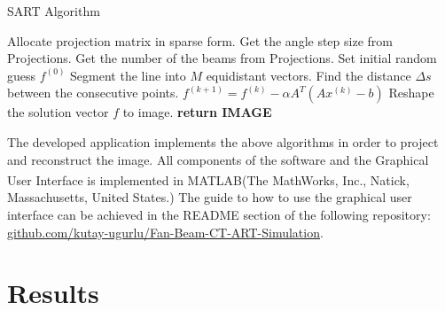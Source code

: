 \documentclass[journal]{IEEEtran}
\begin{document}
\begin{algorithm}[h]
	\caption{SART Algorithm}
	\begin{algorithmic}
		\State Allocate projection matrix in sparse form.
		\State Get the angle step size from Projections. 
		\State Get the number of the beams from Projections. 
		\State Set initial random guess $f^{(0)}$
				\State Segment the line into $M$ equidistant vectors. 
				\State Find the distance $\Delta s$ between the consecutive points.
				\EndFor 
			  \EndFor
		   \EndFor
				\State $f^{(k+1)} = f^{(k)} - \alpha A^T(Ax^{(k)}-b)$
		   \EndFor
		   \State Reshape the solution vector $f$ to image. 
		   \State \textbf{return IMAGE}
		\EndProcedure
	\label{alg:SART}
	\end{algorithmic}
\end{algorithm}

\newpage

The developed application implements the above algorithms in order to project and reconstruct the image. All components of the software and the Graphical User Interface is implemented in MATLAB(The MathWorks\textsuperscript{\textregistered}, Inc., Natick, Massachusetts, United States.) The guide to how to use the graphical user interface can be achieved in the README section of the following repository: \href{https://github.com/kutay-ugurlu/Fan-Beam-CT-ART-Simulation}{github.com/kutay-ugurlu/Fan-Beam-CT-ART-Simulation}.
\newpage

\section{Results}\label{sec:results}


\newpage
\printbibliography
\end{document}

